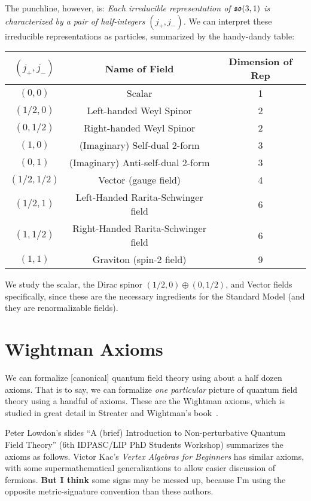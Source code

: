 The punchline, however, is: \textit{Each irreducible representation of $\mathfrak{so}(3,1)$
is characterized by a pair of half-integers $(j_{+}, j_{-})$.} We can
interpret these irreducible representations as particles, summarized by
the handy-dandy table:

\begin{center}
\begin{tabular}{c|c|c}
  $(j_{+}, j_{-})$ & Name of Field & Dimension of Rep \\\hline
  $(0, 0)$ &	Scalar  &	1\\
$(1/2, 0)$ & 	Left-handed Weyl Spinor &	2\\
$(0, 1/2)$ &	Right-handed Weyl Spinor &	2\\
$(1, 0)$ &	(Imaginary) Self-dual 2-form &	3\\
$(0, 1)$ &	(Imaginary) Anti-self-dual 2-form &	3\\
$(1/2, 1/2)$ &	Vector (gauge field) &	4\\
$(1/2, 1)$ & 	Left-Handed Rarita-Schwinger field &	6\\
$(1, 1/2)$ &	Right-Handed Rarita-Schwinger field &	6\\
$(1, 1)$ &	Graviton (spin-2 field) &	9
\end{tabular}
\end{center}

\M
We study the scalar, the Dirac spinor $(1/2, 0)\oplus(0, 1/2)$, and
Vector fields specifically, since these are the necessary ingredients
for the Standard Model (and they are renormalizable fields).

\section{Wightman Axioms}

\M
We can formalize [canonical] quantum field theory using about a half
dozen axioms. That is to say, we can formalize \emph{one particular}
picture of quantum field theory using a handful of axioms.
These are the Wightman axioms, which is studied in great detail in
Streater and Wightman's book~\cite{Streater:1989vi}.

\begin{remark}
Peter Lowdon's slides ``A (brief) Introduction to Non-perturbative
Quantum Field Theory'' (6th IDPASC/LIP PhD Students Workshop) summarizes
the axioms as follows. Victor Kac's \textit{Vertex Algebras for Beginners}
has similar axioms, with some supermathematical generalizations to allow
easier discussion of fermions. \textbf{But I think} some signs may be
messed up, because I'm using the opposite metric-signature convention
than these authors.
\end{remark}

